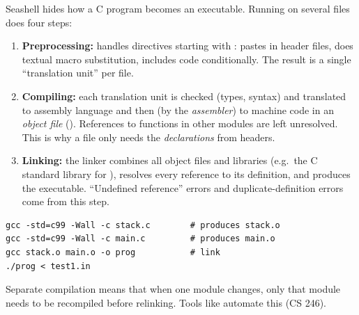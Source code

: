 Seashell hides how a C program becomes an executable. Running  on several files does
four steps:
\begin{center}
\end{center}
\begin{enumerate}
  \item \textbf{Preprocessing:} handles directives starting with \code{\#}: 
    pastes in header files,  does textual macro substitution, 
    includes code conditionally. The result is a single ``translation unit'' per  file.
  \item \textbf{Compiling:} each translation unit is checked (types, syntax) and translated to
    assembly language and then (by the \emph{assembler}) to machine code in an \emph{object file}
    (). References to functions in other modules are left unresolved. This is why a
     file only needs the \emph{declarations} from headers.
  \item \textbf{Linking:} the linker combines all object files and libraries (e.g.\ the C
    standard library for ), resolves every reference to its definition, and
    produces the executable. ``Undefined reference'' errors and duplicate-definition errors come
    from this step.
\end{enumerate}
\begin{lstlisting}[style=bash]
gcc -std=c99 -Wall -c stack.c        # produces stack.o
gcc -std=c99 -Wall -c main.c         # produces main.o
gcc stack.o main.o -o prog           # link
./prog < test1.in
\end{lstlisting}
Separate compilation means that when one module changes, only that module needs to be
recompiled before relinking. Tools like  automate this (CS 246).

